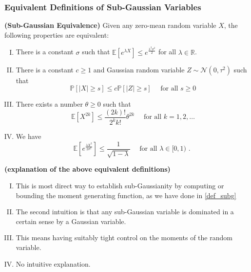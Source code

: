 \documentclass{article}
\newcommand{\bfs}[1]{\textbf{({#1})}}
\begin{document}
\subsubsection{Equivalent Definitions of Sub-Gaussian Variables}\label{ssec:def_equ_gau}

\begin{thma}{\bfs{Sub-Gaussian Equivalence}}\label{thmdef_equ_gau}
 Given any zero-mean random variable $X$, the following properties are equivalent:
 \begin{enumerate}[(I)]
     \item There is a constant $\sigma$ such that $\mathbb{E}\left[e^{\lambda X}\right] \leq e^{\frac{\lambda^{2} \sigma^{2}}{2}}$ for all $\lambda \in \mathbb{R}$.
     \item There is a constant $c \geq 1$ and Gaussian random variable $Z \sim \mathcal{N}\left(0, \tau^{2}\right)$ such that
$$
\mathbb{P}[|X| \geq s] \leq c \mathbb{P}[|Z| \geq s] \quad \text { for all } s \geq 0
$$
\item  There exists a number $\theta \geq 0$ such that
$$
\mathbb{E}\left[X^{2 k}\right] \leq \frac{(2 k) !}{2^{k} k !} \theta^{2 k} \quad \text { for all } k=1,2, \ldots
$$
\item  We have
$$
\mathbb{E}\left[e^{\frac{\lambda X^{2}}{2 \sigma^{2}}}\right] \leq \frac{1}{\sqrt{1-\lambda}} \quad \text { for all } \lambda \in[0,1) \text { . }
$$
 \end{enumerate}
\end{thma}
\begin{rema}{\bfs{explanation of the above equivalent definitions}}\label{remthmdef_equ_gau}
\begin{enumerate}[(I)]
    \item This is most direct way to establish sub-Gaussianity by computing or bounding the moment generating function, as we have done in \cref{def_subg} 
    \item The second intuition is that any sub-Gaussian variable is dominated in a certain sense by a Gaussian variable.
    \item This means having suitably tight control on  the moments of the random variable. 
    \item No intuitive explanation.
\end{enumerate}
\end{rema}
\end{document}
